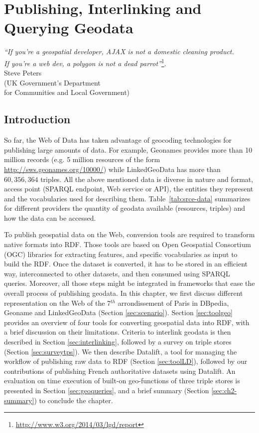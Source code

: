 \chapter{Publishing, Interlinking and Querying Geodata}
\label{ch:ch2}

\begin{flushright}
\textit{``If you're a geospatial developer, AJAX is not a domestic cleaning product. \\
If you're a web dev, a polygon is not a dead parrot''}\footnote{\url{http://www.w3.org/2014/03/lgd/report}}.\\
Steve Peters \\
(UK Government's Department \\for Communities and Local Government)
\end{flushright}

\section*{Introduction}
\label{sec:intro-ch2}
So far, the Web of Data has taken advantage of geocoding technologies for publishing large amounts of data. For example, Geonames provides more than 10 million records (e.g. 5 million resources of the form \url{http://sws.geonames.org/10000/}) while LinkedGeoData has more than $60,356,364$ triples. All the above mentioned data is diverse in nature and format, access point (SPARQL endpoint, Web service or API), the entities they represent and the vocabularies used for describing them. Table~\ref{tab:srce-data} summarizes for different providers the quantity of geodata available (resources, triples) and how the data can be accessed.

To publish geospatial data on the Web, conversion tools are required to transform native formats into RDF. Those tools are based on Open Geospatial Consortium (OGC) libraries for extracting features, and specific vocabularies as input to build the RDF. Once the dataset is converted, it has to be stored in an efficient way, interconnected to other datasets, and then consumed using SPARQL queries. Moreover, all those steps might be integrated in frameworks that ease the overall process of publishing geodata. In this chapter, we first discuss different representation on the Web of the 7$^{th}$ arrondissement of Paris in DBpedia, Geoname and LinkedGeoData (Section \ref{sec:scenario}). Section \ref{sec:toolgeo} provides an overview of four tools for converting geospatial data into RDF, with a brief discussion on their limitations. Criteria to interlink geodata is then described in Section \ref{sec:interlinking}, followed by a survey on triple stores (Section \ref{sec:surveytps}). We then describe Datalift, a tool for managing the workflow of publishing raw data to RDF (Section \ref{sec:toolLD}), followed by our contributions of publishing French authoritative datasets using Datalift. An evaluation on time execution of built-on geo-functions of three triple stores is presented in Section \ref{sec:geoqueries}, and a brief summary (Section \ref{sec:ch2-summary}) to conclude the chapter.

